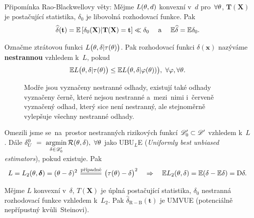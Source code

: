 \begin{remark}
	Připomínka Rao-Blackwellovy věty: Mějme $L(\theta,d)$ konvexní v~$d$ pro~$\forall\theta$, $\textbf{T}(\textbf{X})$ je postačující statistika, $\delta_0$ je libovolná rozhodovací funkce. Pak $$\widehat{\delta}(\textbf{t})=\mathbb{E}\left[ \delta_0(\textbf{X})|\textbf{T}(\textbf{X})=\textbf{t} \right]\ll \delta_0\quad\text{ a~}\quad\mathbb{E}\widehat{\delta}=\mathbb{E} \delta_0.$$
\end{remark}
\begin{define}
	Označme ztrátovou funkci $L\big(\theta,\delta|\tau(\theta)\big)$. Pak rozhodovací funkci $\delta(\textbf{x})$ nazýváme \textbf{nestrannou} vzhledem k~$L$, pokud $$ \mathbb{E} L\big(\theta,\delta|\tau(\theta)\big)\leq \mathbb{E} L\big(\theta,\delta|\varphi(\theta))\big),~\forall\varphi,\forall\theta.$$
\end{define}	\begin{figure}[h]
	\centering
	\caption{Modře jsou vyznačeny nestranné odhady, existují také odhady vyznačeny černě, které nejsou nestranné a~mezi~nimi i~červeně vyznačený odhad, který sice není nestranný, ale stejnoměrně vylepšuje všechny nestranné odhady.}
	\label{fig:3}
\end{figure}
Omezili jsme se~na~prostor nestranných rizikových funkcí $\mathscr{D}'_0\subset \mathscr{D}' $ vzhledem k~$L$. Dále
$ \delta_U^0~=~\mathop{\mathrm{argmin}}\limits_{\delta\in\mathscr{D}' _0}\mathcal{R}(\theta,\delta),~\forall\theta$ jako UBU$_L$E (\textit{Uniformly best unbiased estimators}), pokud existuje. Pak
$$ L=L_2(\t,\boldsymbol{\delta})=(\t-\delta)^2\equal{\text{případně}}\big(\tau(\t)-\delta\big)^2\quad\Rightarrow\quad \E L_2(\t,\delta)=\E (\delta-\E \delta)=\D \delta.$$


\begin{theorem}
	Mějme $L$ konvexní v~$\delta$, $T(\textbf{X})$ je úplná postačující statistika, $\delta_0$ nestranná rozhodovací funkce vzhledem k~$L_2$. Pak $\widehat{\delta}_\mathrm{R-B}(\textbf{t})$ je UMVUE (potenciálně nepřípustný kvůli~Steinovi).
	
	
\end{theorem}

